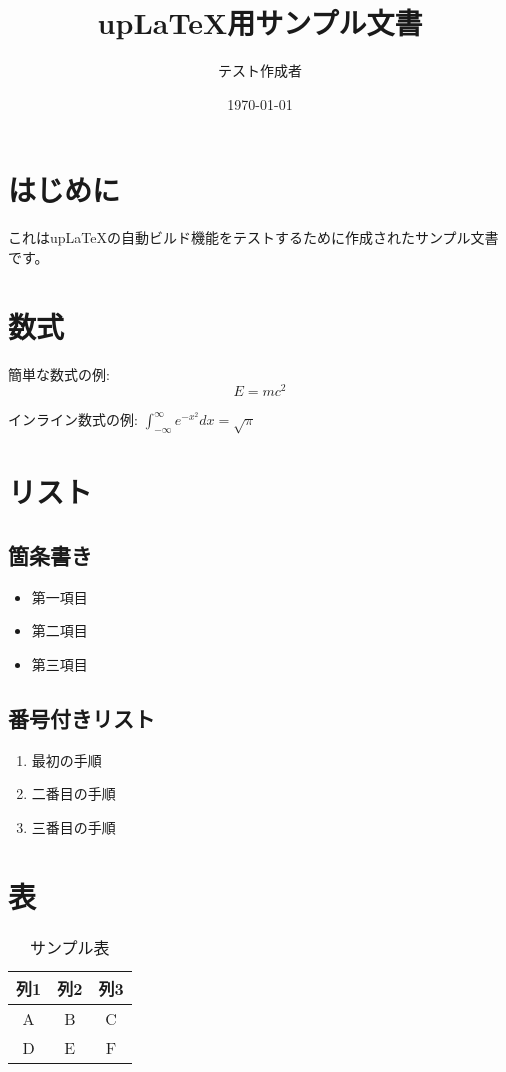 \documentclass[a4paper,12pt]{ujarticle}
\title{upLaTeX用サンプル文書}
\author{テスト作成者}
\date{\today}
\begin{document}
\maketitle

\section{はじめに}

これはupLaTeXの自動ビルド機能をテストするために作成されたサンプル文書です。

\section{数式}

簡単な数式の例:
\begin{equation}
    E = mc^2
\end{equation}

インライン数式の例: $\int_{-\infty}^{\infty} e^{-x^2} dx = \sqrt{\pi}$

\section{リスト}

\subsection{箇条書き}
\begin{itemize}
    \item 第一項目
    \item 第二項目
    \item 第三項目
\end{itemize}

\subsection{番号付きリスト}
\begin{enumerate}
    \item 最初の手順
    \item 二番目の手順
    \item 三番目の手順
\end{enumerate}

\section{表}

\begin{table}[h]
    \centering
    \begin{tabular}{|c|c|c|}
        \hline
        列1 & 列2 & 列3 \\
        \hline
        A  & B  & C  \\
        D  & E  & F  \\
        \hline
    \end{tabular}
    \caption{サンプル表}
    \label{tab:sample}
\end{table}
\end{document}
